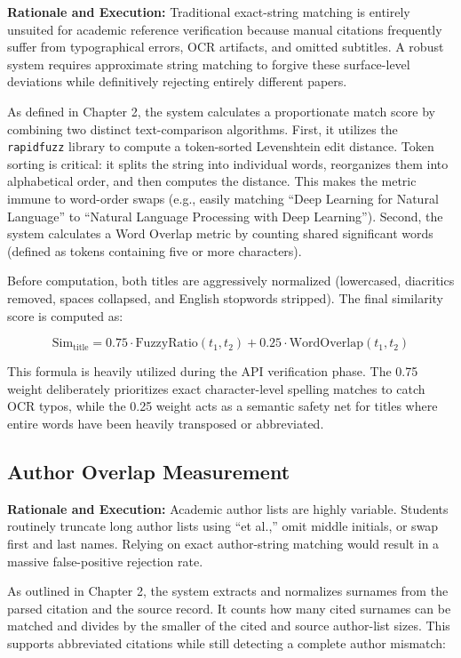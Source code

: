 \documentclass[12pt,a4paper,oneside]{report}
\begin{document}
\textbf{Rationale and Execution:} Traditional exact-string matching is entirely unsuited for academic reference verification because manual citations frequently suffer from typographical errors, OCR artifacts, and omitted subtitles. A robust system requires approximate string matching to forgive these surface-level deviations while definitively rejecting entirely different papers.

As defined in Chapter 2, the system calculates a proportionate match score by combining two distinct text-comparison algorithms. First, it utilizes the \texttt{rapidfuzz} library \cite{bachmann2024} to compute a token-sorted Levenshtein edit distance. Token sorting is critical: it splits the string into individual words, reorganizes them into alphabetical order, and then computes the distance. This makes the metric immune to word-order swaps (e.g., easily matching ``Deep Learning for Natural Language'' to ``Natural Language Processing with Deep Learning''). Second, the system calculates a Word Overlap metric by counting shared significant words (defined as tokens containing five or more characters). 

Before computation, both titles are aggressively normalized (lowercased, diacritics removed, spaces collapsed, and English stopwords stripped). The final similarity score is computed as:

\begin{equation}
\text{Sim}_{\text{title}} = 0.75 \cdot \text{FuzzyRatio}(t_1, t_2) + 0.25 \cdot \text{WordOverlap}(t_1, t_2)
\end{equation}

This formula is heavily utilized during the API verification phase. The 0.75 weight deliberately prioritizes exact character-level spelling matches to catch OCR typos, while the 0.25 weight acts as a semantic safety net for titles where entire words have been heavily transposed or abbreviated.

\subsection{Author Overlap Measurement}

\textbf{Rationale and Execution:} Academic author lists are highly variable. Students routinely truncate long author lists using ``et al.,'' omit middle initials, or swap first and last names. Relying on exact author-string matching would result in a massive false-positive rejection rate.

As outlined in Chapter 2, the system extracts and normalizes surnames from the parsed citation and the source record. It counts how many cited surnames can be matched and divides by the smaller of the cited and source author-list sizes. This supports abbreviated citations while still detecting a complete author mismatch:
\end{document}
